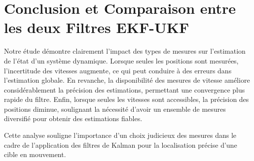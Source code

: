 \chapter*{Conclusion et Comparaison entre les deux Filtres EKF-UKF}
Notre étude démontre clairement l'impact des types de mesures sur l'estimation de l'état d'un système dynamique. Lorsque seules les positions sont mesurées, l'incertitude des vitesses augmente, ce qui peut conduire à des erreurs dans l'estimation globale. 
En revanche, la disponibilité des mesures de vitesse améliore considérablement la précision des estimations, permettant une convergence plus rapide du filtre. 
Enfin, lorsque seules les vitesses sont accessibles, la précision des positions diminue, soulignant la nécessité d'avoir un ensemble de mesures diversifié pour obtenir des estimations fiables. 


Cette analyse souligne l'importance d'un choix judicieux des mesures dans le cadre de l'application des filtres de Kalman pour la localisation précise d'une cible en mouvement.